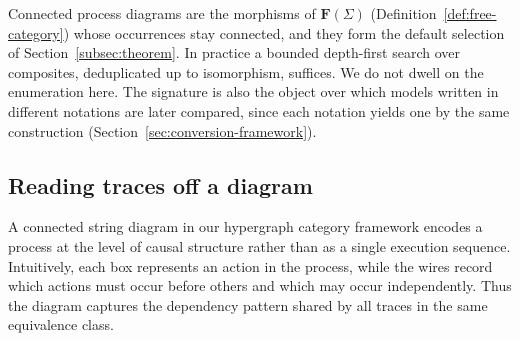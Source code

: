 Connected process diagrams are the morphisms of $\mathbf{F}(\Sigma)$
(Definition~\ref{def:free-category}) whose occurrences stay connected, and they form the
default selection of Section~\ref{subsec:theorem}. In practice a
bounded depth-first search over composites, deduplicated up to isomorphism, suffices. We
do not dwell on the enumeration here. The signature is also the object over which models written in different notations are later compared, since each notation yields one by the same construction (Section~\ref{sec:conversion-framework}).

\subsection{Reading traces off a diagram}\label{sec:semantics}

A connected string diagram in our hypergraph category framework encodes a process at the level of causal structure rather than as a single execution sequence. Intuitively, each box represents an action in the process, while the wires record which actions must occur before others and which may occur independently. Thus the diagram captures the dependency pattern shared by all traces in the same equivalence class.

